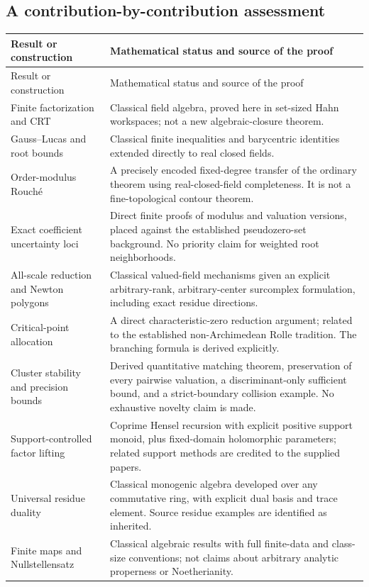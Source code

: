 \documentclass[11pt,letterpaper]{article}
\numberwithin{equation}{section}
\theoremstyle{definition}
\theoremstyle{remark}
\begin{document}
\subsection{A contribution-by-contribution assessment}
\begin{longtable}{@{}P{0.30\textwidth}P{0.65\textwidth}@{}}
\toprule
Result or construction & Mathematical status and source of the proof\\
\midrule
\endfirsthead
\toprule Result or construction & Mathematical status and source of the proof\\
\midrule
\endhead
Finite factorization and CRT & Classical field algebra, proved here in set-sized Hahn workspaces; not a new algebraic-closure theorem.\\[0.5em]
Gauss--Lucas and root bounds & Classical finite inequalities and barycentric identities extended directly to real closed fields.\\[0.5em]
Order-modulus Rouch\'e & A precisely encoded fixed-degree transfer of the ordinary theorem using real-closed-field completeness. It is not a fine-topological contour theorem.\\[0.5em]
Exact coefficient uncertainty loci & Direct finite proofs of modulus and valuation versions, placed against the established pseudozero-set background. No priority claim for weighted root neighborhoods.\\[0.5em]
All-scale reduction and Newton polygons & Classical valued-field mechanisms given an explicit arbitrary-rank, arbitrary-center surcomplex formulation, including exact residue directions.\\[0.5em]
Critical-point allocation & A direct characteristic-zero reduction argument; related to the established non-Archimedean Rolle tradition. The branching formula is derived explicitly.\\[0.5em]
Cluster stability and precision bounds & Derived quantitative matching theorem, preservation of every pairwise valuation, a discriminant-only sufficient bound, and a strict-boundary collision example. No exhaustive novelty claim is made.\\[0.5em]
Support-controlled factor lifting & Coprime Hensel recursion with explicit positive support monoid, plus fixed-domain holomorphic parameters; related support methods are credited to the supplied papers.\\[0.5em]
Universal residue duality & Classical monogenic algebra developed over any commutative ring, with explicit dual basis and trace element. Source residue examples are identified as inherited.\\[0.5em]
Finite maps and Nullstellensatz & Classical algebraic results with full finite-data and class-size conventions; not claims about arbitrary analytic properness or Noetherianity.\\
\bottomrule
\end{longtable}
\end{document}
